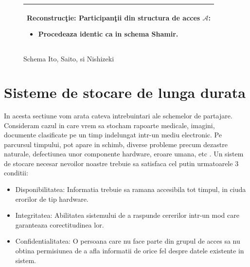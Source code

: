 \documentclass{llncs}
\begin{document}
\begin{figure}[h!]
\begin{tabular}{|p{\textwidth}|}
\hspace{.1in}
\textbf{Reconstruc\c{t}ie}: Participan\c{t}ii din structura de acces $\mathcal{A}$:
	\begin{itemize}
		\item Procedeaza identic ca in schema Shamir.
	\end{itemize}


\\
\hline
\end{tabular}

\caption{Schema Ito, Saito, si Nishizeki \cite{ITO:1989}}
\label{fig:ito_et_al}
\end{figure}





\section{Sisteme de stocare de lunga durata}

In acesta sectiune vom arata cateva intrebuintari ale schemelor de partajare. Consideram cazul in care vrem sa stocham rapoarte medicale, imagini, documente clasificate pe un timp indelungat intr-un mediu electronic. Pe parcursul timpului, pot apare in schimb, diverse probleme precum dezastre naturale, defectiunea unor componente hardware, eroare umana, etc \cite{SGMV:2009}.
Un sistem de stocare necesar nevoilor noastre trebuie sa satisfaca cel putin urmatoarele 3 conditii:
\begin{itemize}
	\item Disponibilitatea: Informatia trebuie sa ramana accesibila tot timpul, in ciuda erorilor de tip hardware.
	\item Integritatea: Abilitatea sistemului de a raspunde cererilor intr-un mod care garanteaza corectitudinea lor.
	\item Confidentialitatea: O persoana care nu face parte din grupul de acces sa nu obtina permisiunea de a afla informatii de orice fel despre datele existente in sistem.
\end{itemize}
\end{document}
